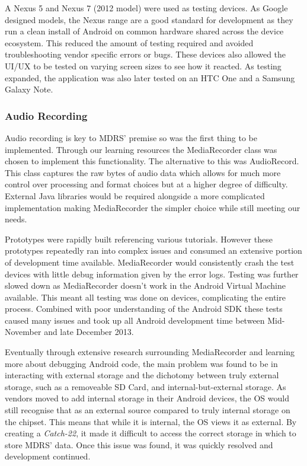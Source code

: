 \documentclass{l3proj}
\begin{document}
A Nexus 5 and Nexus 7 (2012 model) were used as testing devices. As Google designed models, the Nexus range are a good standard for development as they run a clean install of Android on common hardware shared across the device ecosystem. This reduced the amount of testing required and avoided troubleshooting vendor specific errors or bugs. These devices also allowed the UI/UX to be tested on varying screen sizes to see how it reacted. As testing expanded, the application was also later tested on an HTC One and a Samsung Galaxy Note.

\subsubsection{Audio Recording}    Audio recording is key to MDRS' premise so was the first thing to be implemented. Through our learning resources the MediaRecorder class was chosen to implement this functionality. The alternative to this was AudioRecord. This class captures the raw bytes of audio data which allows for much more control over processing and format choices but at a higher degree of difficulty. External Java libraries would be required alongside a more complicated implementation making MediaRecorder the simpler choice while still meeting our needs.

Prototypes were rapidly built referencing various tutorials. However these prototypes repeatedly ran into complex issues and consumed an extensive portion of development time available. MediaRecorder would consistently crash the test devices with little debug information given by the error logs. Testing was further slowed down as MediaRecorder doesn't work in the Android Virtual Machine available. This meant all testing was done on devices, complicating the entire process. Combined with poor understanding of the Android SDK these tests caused many issues and took up all Android development time between Mid-November and late December 2013.

Eventually through extensive research surrounding MediaRecorder and learning more about debugging Android code, the main problem was found to be in interacting with external storage and the dichotomy between truly external storage, such as a removeable SD Card, and internal-but-external storage. As vendors moved to add internal storage in their Android devices, the OS would still recognise that as an external source compared to truly internal storage on the chipset. This means that while it is internal, the OS views it as external. By creating a \textit{Catch-22}, it made it difficult to access the correct storage in which to store MDRS' data. Once this issue was found, it was quickly resolved and development continued.
\end{document}
